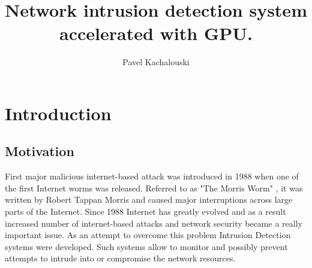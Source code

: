 \documentclass[thesis=M,english]{FITthesis}[2011/07/15]
\title{Network intrusion detection system accelerated with GPU.}
\author{Pavel Kachalouski} %
\begin{document}

\chapter{Introduction}
\label{chap:introduction}
\section{Motivation}
First major malicious internet-based attack was introduced in 1988 when one of the first Internet worms was released. Referred to as "The Morris Worm" \cite{morris_worm}, it was written by Robert Tappan Morris and caused major interruptions across large parts of the Internet. Since 1988 Internet has greatly evolved and as a result increased number of internet-based attacks and network security became a really important issue. As an attempt to overcome this problem Intrusion Detection systems were developed. Such systems allow to monitor and possibly prevent attempts to intrude into or compromise the network resources.
\end{document}
